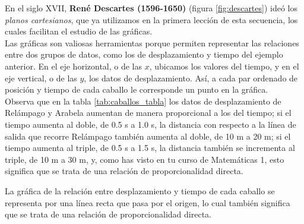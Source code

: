 \documentclass[11pt]{book}
\begin{document}
\begin{minipage}[t]{0.65\linewidth}
    En el siglo XVII, \textbf{René Descartes (1596-1650)} (figura \ref{fig:descartes}) ideó los
    \emph{planos cartesianos}, que ya utilizamos en la primera lección de esta secuencia, los cuales
    facilitan el estudio de las gráficas.\\

    Las gráficas son valiosas herramientas porque permiten representar las relaciones entre dos
    grupos de datos, como los de desplazamiento y tiempo del ejemplo anterior. En el eje horizontal,
    o de las $x$, ubicamos los valores del tiempo, y en el eje vertical, o de las $y$, los datos de
    desplazamiento. Así, a cada par ordenado de posición y tiempo de cada caballo le corresponde
    un punto en la gráfica.\\

    Observa que en la tabla \ref{tab:caballos_tabla} los datos de desplazamiento de Relámpago y Arabela aumentan de manera
    proporcional a los del tiempo; si el tiempo aumenta al doble, de 0.5 s a 1.0 s, la distancia
    con respecto a la línea de salida que recorre Relámpago también aumenta al doble, de 10 m a 20 m;
    si el tiempo aumenta al triple, de 0.5 s a 1.5 s, la distancia también se incrementa al triple,
    de 10 m a 30 m, y, como has visto en tu curso de Matemáticas 1, esto significa que se trata de
    una relación de proporcionalidad directa.

    La gráfica de la relación entre desplazamiento y tiempo de cada caballo se representa por una
    línea recta que pasa por el origen, lo cual también significa que se trata de una relación de
    proporcionalidad directa.
\end{minipage}\hfill
\end{document}
